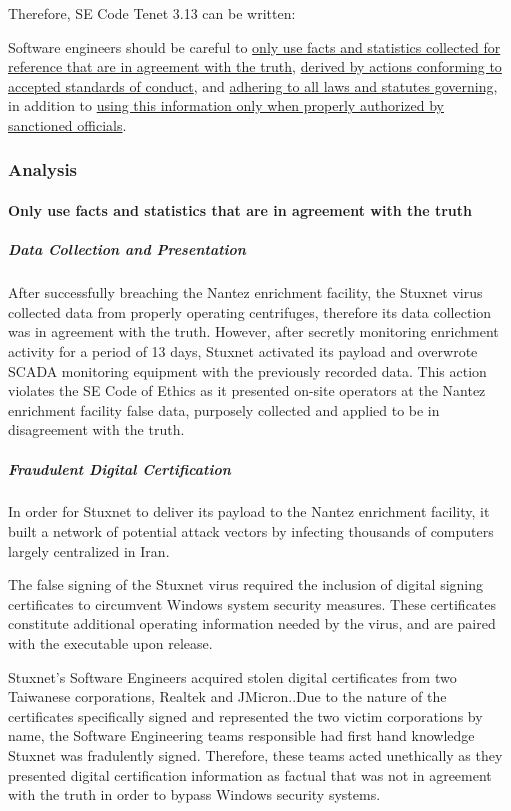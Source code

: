 \documentclass[12pt]{article}
\begin{document}
\begin{multicols}{2}
Therefore, SE Code Tenet 3.13 can be written:
\begin{framed}
Software engineers should be careful to \ul{only use facts and statistics collected for reference that are in agreement with the truth}, \ul{derived by actions conforming to accepted standards of conduct}, and \ul{adhering to all laws and statutes governing}, in addition to \ul{using this information only when properly authorized by sanctioned officials}.
\end{framed}

\subsubsection{Analysis}

\paragraph{Only use facts and statistics that are in agreement with the truth}

\subparagraph{Data Collection and Presentation}

After successfully breaching the Nantez enrichment facility, the Stuxnet virus collected data from properly operating centrifuges, therefore its data collection was in agreement with the truth. However, after secretly monitoring enrichment activity for a period of 13 days, Stuxnet activated its payload and overwrote SCADA monitoring equipment with the previously recorded data. This action violates the SE Code of Ethics as it presented on-site operators at the Nantez enrichment facility false data, purposely collected and applied to be in disagreement with the truth.

\subparagraph{Fraudulent Digital Certification}

In order for Stuxnet to deliver its payload to the Nantez enrichment facility, it built a network of potential attack vectors by infecting thousands of computers largely centralized in Iran.

The false signing of the Stuxnet virus required the inclusion of digital signing certificates to circumvent Windows system security measures. These certificates constitute additional operating information needed by the virus, and are paired with the executable upon release.

Stuxnet's Software Engineers acquired stolen digital certificates from two Taiwanese corporations, Realtek and JMicron.\cite{signedUsingCertificates}.Due to the nature of the certificates specifically signed and represented the two victim corporations by name, the Software Engineering teams responsible had first hand knowledge Stuxnet was fradulently signed. Therefore, these teams acted unethically as they presented digital certification information as factual that was not in agreement with the truth in order to bypass Windows security systems. 


\end{multicols}
\end{document}
